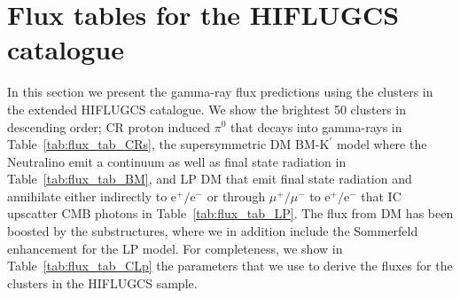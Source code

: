 \documentclass[10pt,aps,pra,reprint,amsmath,amsfonts,amssymb,showpacs,nofootinbib,floatfix]{revtex4-1}
\newcommand{\rmn}{\mathrm}
\newcommand{\Kp}{\rmn{K}^\prime}
\begin{document}
\section{Flux tables for the HIFLUGCS catalogue}

In this section we present the gamma-ray flux predictions using the
clusters in the extended HIFLUGCS catalogue. We show the brightest 50
clusters in descending order; CR proton induced $\pi^0$ that decays
into gamma-rays in Table~\ref{tab:flux_tab_CRs}, the supersymmetric DM
BM-$\Kp$ model where the Neutralino emit a continuum as well as final
state radiation in Table~\ref{tab:flux_tab_BM}, and LP DM that emit
final state radiation and annihilate either indirectly to
$\rmn{e}^+/\rmn{e}^-$ or through $\mu^+/\mu^-$ to
$\rmn{e}^+/\rmn{e}^-$ that IC upscatter CMB photons in
Table~\ref{tab:flux_tab_LP}. The flux from DM has been boosted by the
substructures, where we in addition include the Sommerfeld enhancement
for the LP model. For completeness, we show in
Table~\ref{tab:flux_tab_CLp} the parameters that we use to derive the
fluxes for the clusters in the HIFLUGCS sample.
\end{document}
